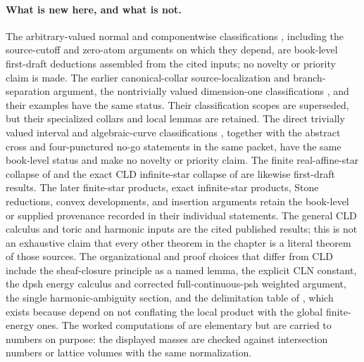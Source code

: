 \paragraph{What is new here, and what is not.}
The arbitrary-valued normal and componentwise classifications
, including the source-cutoff
and zero-atom arguments on which they depend, are book-level first-draft
deductions assembled from the cited inputs; no novelty or priority claim is
made.  The earlier canonical-collar source-localization and branch-separation
argument, the nontrivially valued dimension-one classifications
, and their examples have the same
status.  Their classification scopes are superseded, but their specialized
collars and local lemmas are retained.  The direct trivially valued interval
and algebraic-curve
classifications
, together with the abstract
cross and four-punctured no-go statements in the same packet, have the same
book-level status and make no novelty or priority claim.  The finite
real-affine-star collapse of
 and the exact CLD
infinite-star collapse of
 are likewise first-draft
results.  The later finite-star products, exact infinite-star products,
Stone reductions, convex developments, and insertion arguments retain the
book-level or supplied provenance recorded in their individual statements.
The general CLD calculus and toric and harmonic inputs are the cited
published results; this is not an exhaustive claim that every other theorem
in the chapter is a literal theorem of those sources.
The organizational and proof
choices that differ from CLD include the sheaf-closure
principle as a named lemma, the explicit CLN constant, the dpsh energy
calculus and corrected full-continuous-psh weighted argument, the single
harmonic-ambiguity section, and the delimitation table of
, which exists because
 depend on not conflating the local
product with the global finite-energy ones.  The worked computations of
 are elementary but are carried to numbers on purpose:
the displayed masses are checked against intersection numbers or lattice
volumes with the same normalization.
